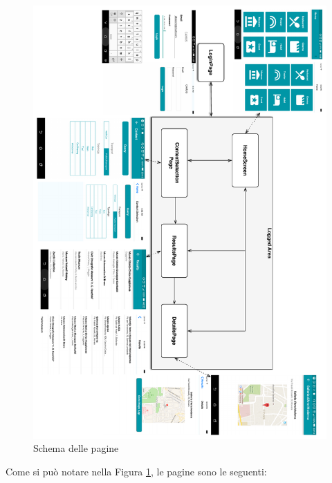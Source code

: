 \begin{figure}[H]
	\centering
	\includegraphics[height=\textwidth, angle=90]{4-progettazione-alto-livello/Immagini/screen_schema.pdf}
	\caption{Schema delle pagine}\label{fig:screen-schema}
\end{figure}
\newpage
Come si può notare nella Figura \ref{fig:screen-schema}, le pagine sono le seguenti:

